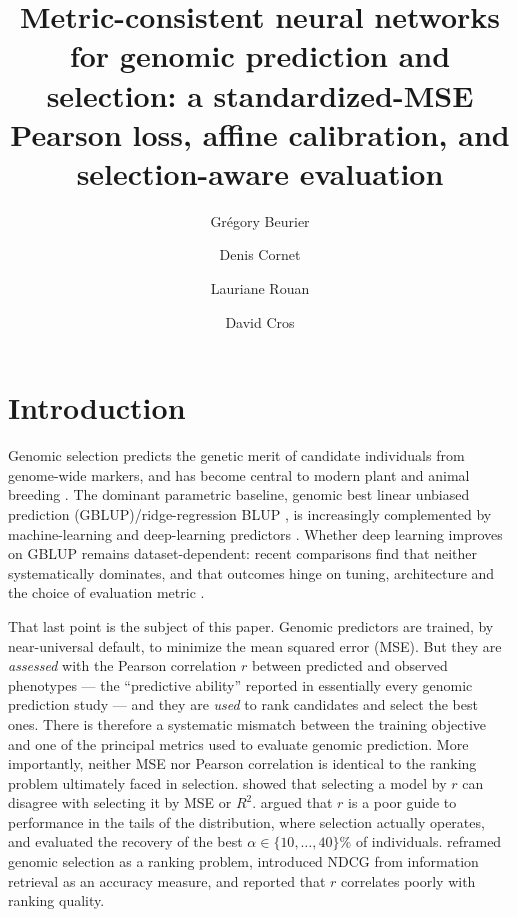 \documentclass[9pt,twocolumn,twoside,lineno]{gsag3jnl}
\title{Metric-consistent neural networks for genomic prediction and selection: a standardized-MSE Pearson loss, affine calibration, and selection-aware evaluation}
\author[$\ast$,$\dagger$,1]{Gr\'egory Beurier}
\author[$\ast$,$\dagger$]{Denis Cornet}
\author[$\ast$,$\dagger$]{Lauriane Rouan}
\author[$\ast$,$\dagger$]{David Cros}
\affil[$\ast$]{CIRAD, UMR AGAP Institut, Avenue Agropolis, 34398 Montpellier Cedex 5, France}
\affil[$\dagger$]{UMR AGAP Institut, Univ Montpellier, CIRAD, INRAE, Institut Agro, Montpellier, France}
\theoremstyle{plain}
\theoremstyle{remark}
\begin{document}
\maketitle
\thispagestyle{firststyle}
\logomark
\articletypemark
\marginmark
\firstpagefootnote

\vspace{-34pt}%

\section{Introduction}

Genomic selection \citep{meuwissen2001} predicts the genetic merit of candidate
individuals from genome-wide markers, and has become central to modern plant and
animal breeding \citep{heffner2009,jannink2010,desta2014}. The dominant
parametric baseline, genomic best linear unbiased prediction
(GBLUP)/ridge-regression BLUP \citep{vanraden2008,endelman2011}, is increasingly
complemented by machine-learning and deep-learning predictors
\citep{ma2018deepgs,wang2023dnngp,montesinos2021review,montesinos2021power}.
Whether deep learning improves on GBLUP remains dataset-dependent: recent
comparisons find that neither systematically dominates, and that outcomes hinge
on tuning, architecture and the choice of evaluation metric
\citep{montesinos2025dlgblup}.

That last point is the subject of this paper. Genomic predictors are trained, by
near-universal default, to minimize the mean squared error (MSE). But they are
\emph{assessed} with the Pearson correlation $r$ between predicted and observed
phenotypes --- the ``predictive ability'' reported in essentially every genomic
prediction study \citep{crossa2010} --- and they are \emph{used} to rank
candidates and select the best ones. There is therefore a systematic mismatch
between the training objective and one of the principal metrics used to evaluate
genomic prediction. More importantly, neither MSE nor Pearson correlation is
identical to the ranking problem ultimately faced in selection.
\citet{waldmann2019} showed that selecting a model by $r$ can disagree with
selecting it by MSE or $R^2$. \citet{ornella2014} argued that $r$ is a poor guide
to performance in the tails of the distribution, where selection actually
operates, and evaluated the recovery of the best $\alpha\in\{10,\dots,40\}\%$ of
individuals. \citet{blondel2015} reframed genomic selection as a ranking problem,
introduced NDCG from information retrieval as an accuracy measure, and reported
that $r$ correlates poorly with ranking quality.
\end{document}
